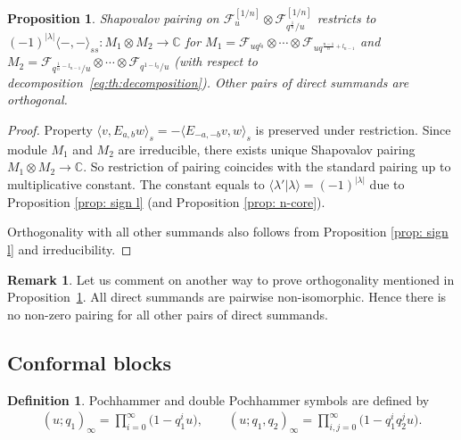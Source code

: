 \documentclass[pdftex]{sigma}
\numberwithin{equation}{section}
\newtheorem{Proposition}[Theorem]{Proposition}
\theoremstyle{definition}
\newtheorem{Remark}[Theorem]{Remark}
\newtheorem{Definition}[Theorem]{Definition}
\begin{document}
\begin{Proposition} \label{prop: Shapoval sign}
Shapovalov pairing on $\mathcal{F}^{[1/n]}_{u} \otimes \mathcal{F}^{[1/n]}_{q^{\frac{1}{n}}/u}$ restricts to $(-1)^{| \lambda |} \langle -, - \rangle_{ss} \colon M_1 \otimes M_2 \rightarrow \mathbb{C}$ for $M_1 = \mathcal{F}_{u q^{ l_0}} \otimes \cdots \otimes \mathcal{F}_{u q^{\frac{n-1}{n}+ l_{n-1}
}}$ and $M_2 = \mathcal{F}_{ q^{\frac{1}{n}- l_{n-1}}/u} \otimes \cdots \otimes \mathcal{F}_{q^{1- l_0}/u}$
{\upshape(}with respect to decomposition~\eqref{eq:th:decomposition}{\upshape)}. Other pairs of direct summands are orthogonal.
\end{Proposition}

\begin{proof}
Property $\langle v, E_{a, b}w \rangle_s = -\langle E_{-a,-b}v, w \rangle_s$ is preserved under restriction. Since module $M_1$ and $M_2$ are irreducible, there exists unique Shapovalov pairing $M_1 \otimes M_2 \rightarrow \mathbb{C}$. So restriction of pairing coincides with the standard pairing up to multiplicative constant. The constant equals to $\langle \lambda' | \lambda \rangle = (-1)^{|\lambda|}$ due to Proposition \ref{prop: sign l} (and Proposition \ref{prop: n-core}).

Orthogonality with all other summands also follows from Proposition \ref{prop: sign l} and irreducibi\-lity.
\end{proof}

\begin{Remark}Let us comment on another way to prove orthogonality mentioned in Proposition~\ref{prop: Shapoval sign}. All direct summands are pairwise non-isomorphic. Hence there is no non-zero pairing for all other pairs of direct summands.
\end{Remark}

\subsection{Conformal blocks}

\begin{Definition}
Pochhammer and double Pochhammer symbols are defined by
\begin{gather*}
(u; q_1)_{\infty} = \prod_{i=0}^{\infty} \big(1-q_1^i u\big), \qquad
(u; q_1, q_2)_{\infty} = \prod_{i,j=0}^{\infty} \big(1-q_1^i q_2^j u\big).
\end{gather*}
\end{Definition}
\end{document}
